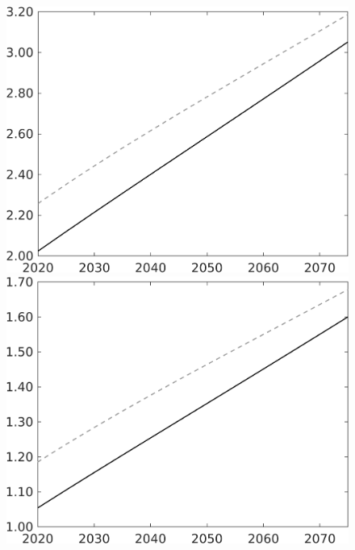 \documentclass[12pt]{article}
\begin{document}
\begin{figure}[h!!]
\begin{minipage}[]{0.32\textwidth}
\end{minipage}	
\begin{minipage}[]{0.32\textwidth}
\includegraphics[width=1\textwidth]{../../codding_model/own_basedOnFried/optimalPol_010922_revision/figures/all_13Sept22/LevTaufNoTauf_TaulCalib_Equlab_regime0_wh_spillover0_nsk0_xgr1_knspil1_sep1_LFlimit0_emsbase0_countec0_GovRev0_etaa0.79_lgd0.png}
\end{minipage}	
\begin{minipage}[]{0.32\textwidth}
\includegraphics[width=1\textwidth]{../../codding_model/own_basedOnFried/optimalPol_010922_revision/figures/all_13Sept22/LevTaufNoTauf_TaulCalib_Equlab_regime0_wl_spillover0_nsk0_xgr1_knspil1_sep1_LFlimit0_emsbase0_countec0_GovRev0_etaa0.79_lgd0.png}

\end{minipage}
\end{figure}
\end{document}
